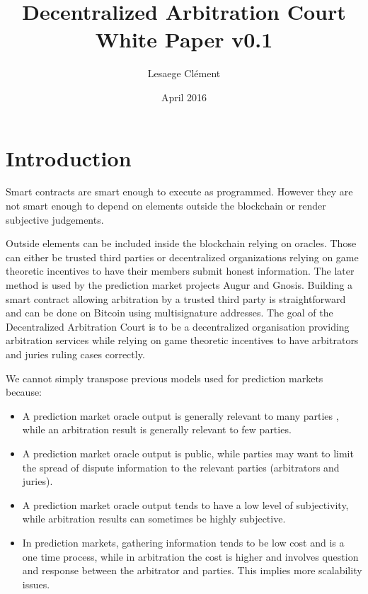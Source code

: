 \documentclass[12 pt]{article}
\title{Decentralized Arbitration Court White Paper v0.1}
\author{Lesaege Clément}
\date{April 2016}
\begin{document}
\maketitle

\section{Introduction}

Smart contracts are smart enough to execute as programmed. However they are not smart enough to depend on elements outside the blockchain or render subjective judgements.

Outside elements can be included inside the blockchain relying on oracles. Those can either be trusted third parties\cite{oraclize}
or decentralized organizations relying on game theoretic incentives to have their members submit honest information. The later method is used by the prediction market projects Augur\cite{augur} and Gnosis\cite{gnosis}.
Building a smart contract allowing arbitration by a trusted third party is straightforward and can be done on Bitcoin\cite{bitcoin} using multisignature addresses\cite{bitrared}. 
The goal of the Decentralized Arbitration Court is to be a decentralized organisation providing arbitration services while relying on game theoretic incentives to have arbitrators and juries ruling cases correctly.

We cannot simply transpose previous models used for prediction markets because:
\begin{itemize}
    \item A prediction market oracle output is generally relevant to many parties \cite{vitalikreddit}, while an arbitration result is generally relevant to few parties.
	\item A prediction market oracle output is public, while parties may want to limit the spread of dispute information to the relevant parties (arbitrators and juries).
	\item A prediction market oracle output tends to have a low level of subjectivity, while arbitration results can sometimes be highly subjective.
	\item In prediction markets, gathering information tends to be low cost and is a one time process, while in arbitration the cost is higher and involves question and response between the arbitrator and parties. This implies more scalability issues.
\end{itemize}
\end{document}
